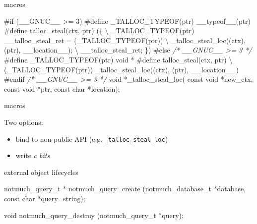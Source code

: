 \documentclass[ignorenonframetext,aspectratio=169]{beamer}
\newenvironment{Shaded}{}{}
\newcommand{\DataTypeTok}[1]{\textcolor[rgb]{0.56,0.13,0.00}{{#1}}}
\newcommand{\CommentTok}[1]{\textcolor[rgb]{0.38,0.63,0.69}{\textit{{#1}}}}
\newcommand{\PreprocessorTok}[1]{\textcolor[rgb]{0.74,0.48,0.00}{{#1}}}
\newcommand{\NormalTok}[1]{{#1}}
\providecommand{\tightlist}{%
  \setlength{\itemsep}{0pt}\setlength{\parskip}{0pt}}
\begin{document}
\begin{frame}[fragile]{macros}

\begin{Shaded}
\begin{Highlighting}[]
\PreprocessorTok{#if (__GNUC__ >= 3)}
\PreprocessorTok{#define _TALLOC_TYPEOF(ptr) __typeof__(ptr)}
\PreprocessorTok{#define talloc_steal(ctx, ptr) (\{ \textbackslash{}}
\PreprocessorTok{  _TALLOC_TYPEOF(ptr) __talloc_steal_ret = (_TALLOC_TYPEOF(ptr)) \textbackslash{}}
\PreprocessorTok{    _talloc_steal_loc((ctx), (ptr), __location__); \textbackslash{}}
\PreprocessorTok{  __talloc_steal_ret; \})}
\PreprocessorTok{#else }\CommentTok{/* __GNUC__ >= 3 */}
\PreprocessorTok{#define _TALLOC_TYPEOF(ptr) void *}
\PreprocessorTok{#define talloc_steal(ctx, ptr) \textbackslash{}}
\PreprocessorTok{  (_TALLOC_TYPEOF(ptr)) _talloc_steal_loc((ctx), (ptr), __location__)}
\PreprocessorTok{#endif }\CommentTok{/* __GNUC__ >= 3 */}
\DataTypeTok{void} \NormalTok{*_talloc_steal_loc(}
  \DataTypeTok{const} \DataTypeTok{void} \NormalTok{*new_ctx, }\DataTypeTok{const} \DataTypeTok{void} \NormalTok{*ptr, }\DataTypeTok{const} \DataTypeTok{char} \NormalTok{*location);}
\end{Highlighting}
\end{Shaded}

\end{frame}

\begin{frame}[fragile]{macros}

Two options:

\begin{itemize}
\tightlist
\item
  bind to non-public API (e.g. \texttt{\_talloc\_steal\_loc})
\item
  write \emph{c bits}
\end{itemize}

\end{frame}

\begin{frame}[fragile]{external object lifecycles}

\begin{Shaded}
\begin{Highlighting}[]
\NormalTok{notmuch_query_t *}
\NormalTok{notmuch_query_create (notmuch_database_t *database,}
                      \DataTypeTok{const} \DataTypeTok{char} \NormalTok{*query_string);}

\DataTypeTok{void}
\NormalTok{notmuch_query_destroy (notmuch_query_t *query);}
\end{Highlighting}
\end{Shaded}

\end{frame}
\end{document}
